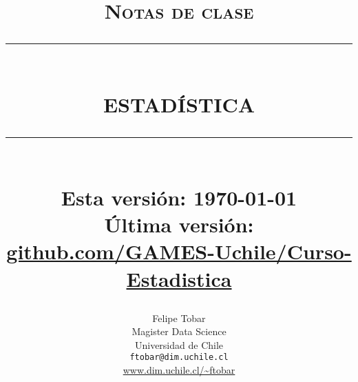 
\newcommand{\HRule}[1]{\rule{\linewidth}{#1}} 	%

\makeatletter							%
\def\printtitle{%
    {\centering \@title\par}}
\makeatother									

\makeatletter							%
\def\printauthor{%
    {\centering \large \@author}}				
\makeatother							

\title{	\normalsize \textsc{Notas de clase} 	%
		 	\\[6.0cm]								%
			\HRule{0.5pt} \\						%
			 \textbf{\uppercase{\LARGE Estadística}}	%
			\HRule{2pt} \\ [0.2cm]		%
			\large Esta versión: \today\\	[0.2cm]		%
			\large Última versión: \href{https://github.com/GAMES-UChile/Curso-Estadistica}{github.com/GAMES-Uchile/Curso-Estadistica}
		}

\author{
		Felipe Tobar\\	
		Magister Data Science\\	
		Universidad de Chile\\[1.0cm]
        \texttt{ftobar@dim.uchile.cl} \\
        \url{www.dim.uchile.cl/~ftobar} \\[1.0cm]
}